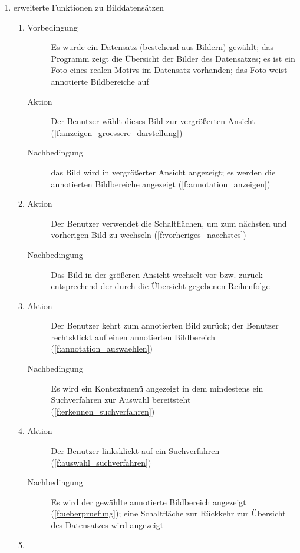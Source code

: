 \begin{enumerate} [label=\bfseries /TS \arabic*0/, leftmargin=*]
	\item erweiterte Funktionen zu Bilddatensätzen
	\begin{enumerate}
		\item
		\begin{description}
			\item[Vorbedingung] Es wurde ein Datensatz (bestehend aus Bildern) gewählt; das Programm zeigt die Übersicht der Bilder des Datensatzes; es ist ein Foto eines realen Motivs im Datensatz vorhanden; das Foto weist annotierte Bildbereiche auf
			\item[Aktion] Der Benutzer wählt dieses Bild zur vergrößerten Ansicht (\ref{f:anzeigen_groessere_darstellung})
			\item[Nachbedingung] das Bild wird in vergrößerter Ansicht angezeigt; es werden die annotierten Bildbereiche angezeigt (\ref{f:annotation_anzeigen})
		\end{description}
		\item
		\begin{description}
			\item[Aktion] Der Benutzer verwendet die Schaltflächen, um zum nächsten und vorherigen Bild zu wechseln (\ref{f:vorheriges_naechstes})
			\item[Nachbedingung] Das Bild in der größeren Ansicht wechselt vor bzw. zurück entsprechend der durch die Übersicht gegebenen Reihenfolge
		\end{description}
		\item
		\begin{description}
			\item[Aktion] Der Benutzer kehrt zum annotierten Bild zurück; der Benutzer rechtsklickt auf einen annotierten Bildbereich (\ref{f:annotation_auswaehlen})
			\item[Nachbedingung] Es wird ein Kontextmenü angezeigt in dem mindestens ein Suchverfahren zur Auswahl bereitsteht (\ref{f:erkennen_suchverfahren})
		\end{description}
		\item
		\begin{description}
			\item[Aktion] Der Benutzer linksklickt auf ein Suchverfahren (\ref{f:auswahl_suchverfahren})
			\item[Nachbedingung] Es wird der gewählte annotierte Bildbereich angezeigt (\ref{f:ueberpruefung}); eine Schaltfläche zur Rückkehr zur Übersicht des Datensatzes wird angezeigt
		\end{description}
		\item

\end{enumerate}
\end{enumerate}
